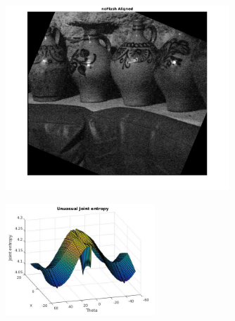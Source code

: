 \documentclass[a4paper]{article}
\begin{document}
\begin{figure}[ht!]
 \centering
\includegraphics[width=0.75\textwidth]{Q5/output/noflash_aligned.jpg}
\end{figure}
\begin{figure}[ht!]
 \centering
\includegraphics[width=0.5\textwidth]{Q5/output/unusual.jpg}
\end{figure}
\end{document}
